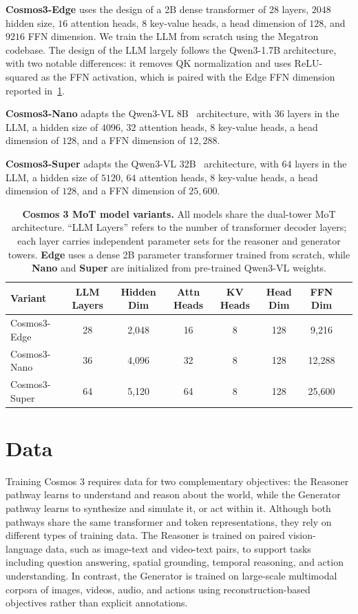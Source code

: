 \documentclass{llmxive}
\begin{document}
\textbf{Cosmos3-Edge} uses the design of a 2B dense transformer of $28$ layers, $2048$ hidden size, $16$ attention heads, $8$ key-value heads, a head dimension of $128$, and $9216$ FFN dimension. We train the LLM from scratch using the Megatron codebase. The design of the LLM largely follows the Qwen3-1.7B architecture, with two notable differences: it removes QK normalization and uses ReLU-squared as the FFN activation, which is paired with the Edge FFN dimension reported in~\cref{tab::model_variants}.

\textbf{Cosmos3-Nano} adapts the Qwen3-VL 8B~\citep{qwen3vl2025} architecture, with $36$ layers in the LLM, a hidden size of $4096$, $32$ attention heads, 8 key-value heads, a head dimension of $128$, and a FFN dimension of $12{,}288$.

\textbf{Cosmos3-Super} adapts the Qwen3-VL 32B~\citep{qwen3vl2025} architecture, with $64$ layers in the LLM, a hidden size of $5120$, $64$ attention heads, $8$ key-value heads, a head dimension of $128$, and a FFN dimension of $25{,}600$.

\begin{table}[!htbp]
\centering
\small
\begin{tabular}{lccccccc}
\toprule
\textbf{Variant} & \textbf{LLM Layers} & \textbf{Hidden Dim}
    & \textbf{Attn Heads} & \textbf{KV Heads} & \textbf{Head Dim}
    & \textbf{FFN Dim} \\
\midrule
Cosmos3-Edge &  28 & 2,048 & 16 & 8 & 128 & 9,216 \\
Cosmos3-Nano &  36 & 4,096 & 32 & 8 & 128 & 12,288 \\
Cosmos3-Super &  64 & 5,120 & 64 & 8 & 128 & 25,600 \\
\bottomrule
\end{tabular}
\caption{
\textbf{Cosmos 3 MoT model variants.}
All models share the dual-tower MoT architecture. ``LLM Layers'' refers to the number of transformer decoder layers; each layer carries independent parameter sets for the reasoner and generator towers. \textbf{Edge} uses a dense 2B parameter transformer trained from scratch, while \textbf{Nano} and \textbf{Super} are initialized from pre-trained Qwen3-VL weights.}
\label{tab::model_variants}
\end{table}


\section{Data}
\label{sec::data}

Training Cosmos 3 requires data for two complementary objectives: the Reasoner pathway learns to understand and reason about the world, while the Generator pathway learns to synthesize and simulate it, or act within it. Although both pathways share the same transformer and token representations, they rely on different types of training data. The Reasoner is trained on paired vision-language data, such as image-text and video-text pairs, to support tasks including question answering, spatial grounding, temporal reasoning, and action understanding. In contrast, the Generator is trained on large-scale multimodal corpora of images, videos, audio, and actions using reconstruction-based objectives rather than explicit annotations.
\end{document}
